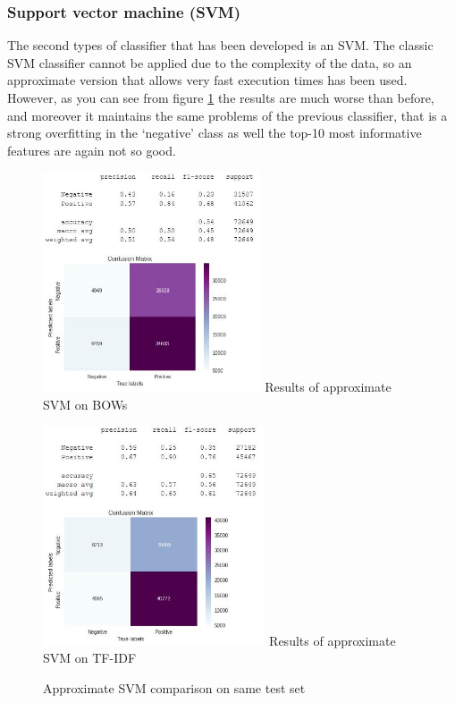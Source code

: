 \documentclass[11pt]{article}
\begin{document}
\subsubsection{Support vector machine (SVM)}
The second types of classifier that has been developed is an SVM. The classic SVM classifier cannot be applied due to the complexity of the data, so an approximate version that allows very fast execution times has been used. However, as you can see from figure \ref{svm_fig} the results are much worse than before, and moreover it maintains the same problems of the previous classifier, that is a strong overfitting in the `negative' class as well the top-10 most informative features are again not so good. 
\begin{figure}[H]
	\begin{minipage}[b]{0.48\textwidth}
		\centering
		\includegraphics[width=\textwidth, height = 6.5cm]{svm_bow.JPG}
		{Results of approximate SVM on BOWs}
	\end{minipage}
	\hfill
	\begin{minipage}[b]{0.48\textwidth}
		\centering
		\includegraphics[width=\textwidth, height = 6.5cm]{svm_tfidf.JPG}
		{Results of approximate SVM on TF-IDF}
	\end{minipage}
	\caption{Approximate SVM comparison on same test set}
	\label{svm_fig}
\end{figure}
\end{document}
